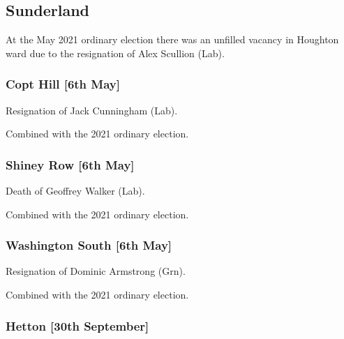 \documentclass[a4paper,openany]{book}
\begin{document}
\begin{resultsiii}
\subsection*{Sunderland}

At the May 2021 ordinary election there was an unfilled vacancy in Houghton ward due to the resignation of Alex Scullion (Lab).

\subsubsection*{Copt Hill \hspace*{\fill}\nolinebreak[1]%
	\enspace\hspace*{\fill}
	[6th May]}


Resignation of Jack Cunningham (Lab).

Combined with the 2021 ordinary election.

\subsubsection*{Shiney Row \hspace*{\fill}\nolinebreak[1]%
	\enspace\hspace*{\fill}
	[6th May]}


Death of Geoffrey Walker (Lab).

Combined with the 2021 ordinary election.

\subsubsection*{Washington South \hspace*{\fill}\nolinebreak[1]%
	\enspace\hspace*{\fill}
	[6th May]}


Resignation of Dominic Armstrong (Grn).

Combined with the 2021 ordinary election.

\subsubsection*{Hetton \hspace*{\fill}\nolinebreak[1]%
	\enspace\hspace*{\fill}
	[30th September]}


\end{resultsiii}
\end{document}

